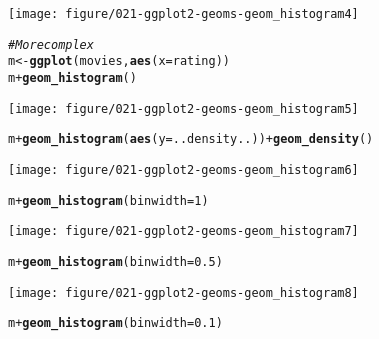 \documentclass[a4paper,titlepage]{tufte-handout}\usepackage[]{graphicx}\usepackage[]{color}
\makeatletter
\def\maxwidth{ %
  \ifdim\Gin@nat@width>\linewidth
    \linewidth
  \else
    \Gin@nat@width
  \fi
}
\newcommand{\hlnum}[1]{\textcolor[rgb]{0.686,0.059,0.569}{#1}}%
\newcommand{\hlcom}[1]{\textcolor[rgb]{0.678,0.584,0.686}{\textit{#1}}}%
\newcommand{\hlopt}[1]{\textcolor[rgb]{0,0,0}{#1}}%
\newcommand{\hlstd}[1]{\textcolor[rgb]{0.345,0.345,0.345}{#1}}%
\newcommand{\hlkwb}[1]{\textcolor[rgb]{0.69,0.353,0.396}{#1}}%
\newcommand{\hlkwc}[1]{\textcolor[rgb]{0.333,0.667,0.333}{#1}}%
\newcommand{\hlkwd}[1]{\textcolor[rgb]{0.737,0.353,0.396}{\textbf{#1}}}%
\newenvironment{kframe}{%
 \def\at@end@of@kframe{}%
 \ifinner\ifhmode%
  \def\at@end@of@kframe{\end{minipage}}%
  \begin{minipage}{\columnwidth}%
 \fi\fi%
 \def\FrameCommand##1{\hskip\@totalleftmargin \hskip-\fboxsep
 \colorbox{shadecolor}{##1}\hskip-\fboxsep
     \hskip-\linewidth \hskip-\@totalleftmargin \hskip\columnwidth}%
 \MakeFramed {\advance\hsize-\width
   \@totalleftmargin\z@ \linewidth\hsize
   \@setminipage}}%
 {\par\unskip\endMakeFramed%
 \at@end@of@kframe}
\newenvironment{knitrout}{}{} %
\makeatother
\begin{document}
\begin{knitrout}
\begin{kframe}
{\ttfamily\noindent\color{warningcolor}{\#\# Warning: position\_stack requires constant width: output may be incorrect}}\end{kframe}
\texttt{[image: figure/021-ggplot2-geoms-geom\_histogram4]} 
\begin{kframe}\begin{alltt}
\hlcom{# More complex}
\hlstd{m} \hlkwb{<-} \hlkwd{ggplot}\hlstd{(movies,} \hlkwd{aes}\hlstd{(}\hlkwc{x}\hlstd{=rating))}
\hlstd{m} \hlopt{+} \hlkwd{geom_histogram}\hlstd{()}
\end{alltt}


{\ttfamily\noindent\itshape\color{messagecolor}{\#\# stat\_bin: binwidth defaulted to range/30. Use 'binwidth = x' to adjust this.}}

{\ttfamily\noindent\color{warningcolor}{\#\# Warning: position\_stack requires constant width: output may be incorrect}}\end{kframe}
\texttt{[image: figure/021-ggplot2-geoms-geom\_histogram5]} 
\begin{kframe}\begin{alltt}
\hlstd{m} \hlopt{+} \hlkwd{geom_histogram}\hlstd{(}\hlkwd{aes}\hlstd{(}\hlkwc{y} \hlstd{= ..density..))} \hlopt{+} \hlkwd{geom_density}\hlstd{()}
\end{alltt}


{\ttfamily\noindent\itshape\color{messagecolor}{\#\# stat\_bin: binwidth defaulted to range/30. Use 'binwidth = x' to adjust this.}}

{\ttfamily\noindent\color{warningcolor}{\#\# Warning: position\_stack requires constant width: output may be incorrect}}\end{kframe}
\texttt{[image: figure/021-ggplot2-geoms-geom\_histogram6]} 
\begin{kframe}\begin{alltt}
\hlstd{m} \hlopt{+} \hlkwd{geom_histogram}\hlstd{(}\hlkwc{binwidth} \hlstd{=} \hlnum{1}\hlstd{)}
\end{alltt}
\end{kframe}
\texttt{[image: figure/021-ggplot2-geoms-geom\_histogram7]} 
\begin{kframe}\begin{alltt}
\hlstd{m} \hlopt{+} \hlkwd{geom_histogram}\hlstd{(}\hlkwc{binwidth} \hlstd{=} \hlnum{0.5}\hlstd{)}
\end{alltt}
\end{kframe}
\texttt{[image: figure/021-ggplot2-geoms-geom\_histogram8]} 
\begin{kframe}\begin{alltt}
\hlstd{m} \hlopt{+} \hlkwd{geom_histogram}\hlstd{(}\hlkwc{binwidth} \hlstd{=} \hlnum{0.1}\hlstd{)}
\end{alltt}



\end{kframe}
\end{knitrout}
\end{document}
